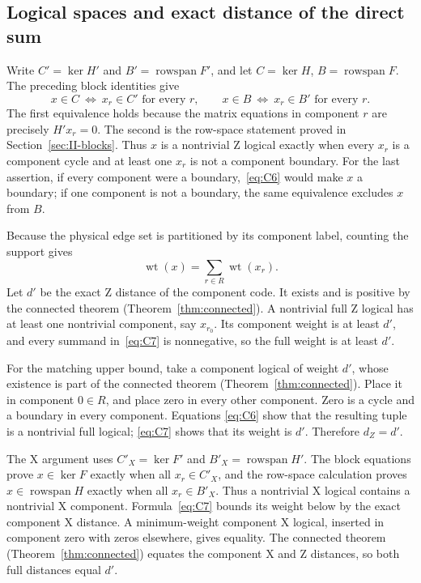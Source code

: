 \documentclass{article}
\numberwithin{equation}{section}
\begin{document}
\subsection{Logical spaces and exact distance of the direct sum}\label{sec:II-distance}

Write \(C'=\ker H'\) and \(B'=\operatorname{rowspan}F'\), and let
\(C=\ker H\), \(B=\operatorname{rowspan}F\). The preceding block identities
give
\begin{equation}\label{eq:C6}
  x\in C\ \Longleftrightarrow\ x_r\in C'\text{ for every }r,\qquad
  x\in B\ \Longleftrightarrow\ x_r\in B'\text{ for every }r.
\end{equation}
The first equivalence holds because the matrix equations in component
\(r\) are precisely \(H'x_r=0\). The second is the row-space statement
proved in Section~\ref{sec:II-blocks}. Thus \(x\) is a nontrivial Z logical exactly
when
every \(x_r\) is a component cycle and at least one \(x_r\) is not a
component boundary. For the last assertion, if every component were
a boundary,~\eqref{eq:C6} would make \(x\) a boundary; if one component is not
a boundary, the same equivalence excludes \(x\) from \(B\).

Because the physical edge set is partitioned by its component label,
counting the support gives
\begin{equation}\label{eq:C7}
  \operatorname{wt}(x)=\sum_{r\in R}\operatorname{wt}(x_r).
\end{equation}
Let \(d'\) be the exact Z distance of the component code. It exists and
is positive by the connected theorem (Theorem~\ref{thm:connected}). A nontrivial full Z
logical
has at least one nontrivial component, say \(x_{r_0}\). Its component
weight is at least \(d'\), and every summand in~\eqref{eq:C7} is nonnegative,
so the full weight is at least \(d'\).

For the matching upper bound, take a component logical of weight
\(d'\), whose existence is part of the connected theorem (Theorem~\ref{thm:connected}).
Place it
in component \(0\in R\), and place zero in every other component.
Zero is a cycle and a boundary in every component. Equations
\eqref{eq:C6} show that the resulting tuple is a nontrivial full logical;
\eqref{eq:C7} shows that its weight is \(d'\). Therefore \(d_Z=d'\).

The X argument uses \(C'_X=\ker F'\) and
\(B'_X=\operatorname{rowspan}H'\). The block equations prove
\(x\in\ker F\) exactly when all \(x_r\in C'_X\), and the row-space
calculation proves \(x\in\operatorname{rowspan}H\) exactly when all
\(x_r\in B'_X\). Thus a nontrivial X logical contains a nontrivial
X component. Formula~\eqref{eq:C7} bounds its weight below by the exact
component X distance. A minimum-weight component X logical,
inserted in component zero with zeros elsewhere, gives equality.
The connected theorem (Theorem~\ref{thm:connected}) equates the component X and Z
distances,
so both full distances equal \(d'\).
\end{document}
